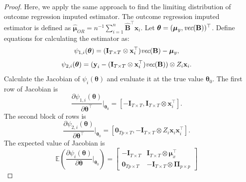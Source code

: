 \documentclass[12pt, A4]{article}
\newcommand{\SumOverN}{\sum_{i=1}^n}
\newcommand{\ObsRes}{\textbf{y}_i}
\newcommand{\ObsCov}{\textbf{x}_i}
\newcommand{\vect}{\emph{vec}}
\newcommand{\IdenMat}{\textbf{I}}
\begin{document}
    \begin{proof}
        Here, we apply the same approach to find the limiting distribution of outcome regression imputed estimator.
        The outcome regression imputed estimator is defined as $\hat{\boldsymbol{\mu}}_{OR} = n^{-1}\SumOverN \hat{\textbf{B}}^{\top}\ObsCov$. Let $\boldsymbol{\theta} = (\boldsymbol{\mu}_y, \vect(\textbf{B}))^{\top}$.
        Define equations for calculating the estimator as:
            \begin{equation}\label{equ:psi4}
                \psi_{1,i}(\boldsymbol{\theta}) = (\IdenMat_{T \times T} \otimes \ObsCov^{\top})\vect(\textbf{B}) - \boldsymbol{\mu}_{y},
            \end{equation}    
            \begin{equation}\label{equ:psi5}
                \psi_{2,i}(\boldsymbol{\theta}) = (\ObsRes - (\IdenMat_{T \times T} \otimes \ObsCov^{\top})\vect(\textbf{B})) \otimes Z_i \ObsCov.
            \end{equation}
        Calculate the Jacobian of $\psi_i(\boldsymbol{\theta})$ and evaluate it at the true value $\boldsymbol{\theta}_0$.
        The first row of Jacobian is
            \begin{equation*}
                \frac{\partial \psi_{1,i}(\boldsymbol{\theta})}{ \partial \boldsymbol{\theta}^{\top} } \biggr\rvert_{\boldsymbol{\theta}_0}  
                = \left[ - \IdenMat_{T \times T}, \IdenMat_{T \times T} \otimes \ObsCov^{\top} \right].
            \end{equation*}        
        The second block of rows is
            \begin{equation*}
                \frac{\partial \psi_{2,i}(\boldsymbol{\theta})}{ \partial \boldsymbol{\theta}^{\top} } \biggr\rvert_{\boldsymbol{\theta}_0} 
                = \left[ \textbf{0}_{Tp \times T},  -\IdenMat_{T \times T} \otimes Z_i\textbf{x}_i\textbf{x}_i^{\top} \right].
            \end{equation*}
        The expected value of Jacobian is 
            \begin{equation*}
                \mathbb{E} \left( \frac{\partial \psi_i(\boldsymbol{\theta})}{ \partial \boldsymbol{\theta}} \biggr\rvert_{\boldsymbol{\theta}_0} \right) 
                    = \begin{bmatrix}
                    -\IdenMat_{T \times T} & \IdenMat_{T \times T} \otimes \boldsymbol{\mu}_x^{\top} \\ 
                    \textbf{0}_{Tp \times T} & -\IdenMat_{T \times T} \otimes \boldsymbol{\Pi}_{p \times p}

\end{bmatrix}
\end{equation*}
\end{proof}
\end{document}
